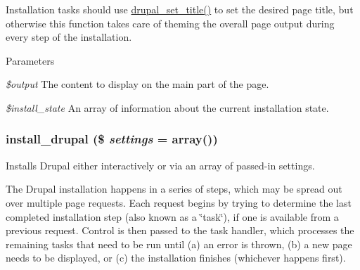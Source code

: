 Installation tasks should use \hyperlink{bootstrap_8inc_a1994d49eb621df71fe1306e13b7e4910}{drupal\_\-set\_\-title()} to set the desired page title, but otherwise this function takes care of theming the overall page output during every step of the installation.


\begin{DoxyParams}{Parameters}
\item[{\em \$output}]The content to display on the main part of the page. \item[{\em \$install\_\-state}]An array of information about the current installation state. \end{DoxyParams}
\hypertarget{install_8core_8inc_ae451893f8ee7ea51f1467cec82a51fad}{
\subsubsection[{install\_\-drupal}]{\setlength{\rightskip}{0pt plus 5cm}install\_\-drupal (\$ {\em settings} = {\ttfamily array()})}}
\label{install_8core_8inc_ae451893f8ee7ea51f1467cec82a51fad}
Installs Drupal either interactively or via an array of passed-\/in settings.

The Drupal installation happens in a series of steps, which may be spread out over multiple page requests. Each request begins by trying to determine the last completed installation step (also known as a \char`\"{}task\char`\"{}), if one is available from a previous request. Control is then passed to the task handler, which processes the remaining tasks that need to be run until (a) an error is thrown, (b) a new page needs to be displayed, or (c) the installation finishes (whichever happens first).


